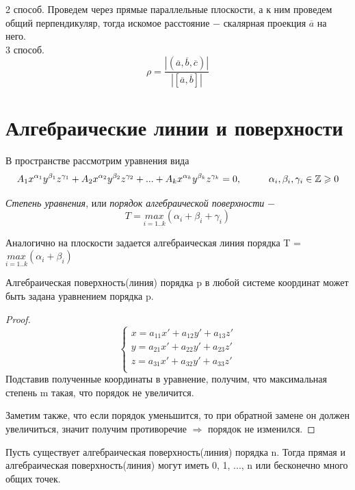 2 способ. Проведем через прямые параллельные плоскости, а к ним проведем общий перпендикуляр, тогда искомое расстояние $-$ скалярная проекция $\overline{a}$ на него.\\

3 способ. \[
\rho = \dfrac{|(\overline{a}, \overline{b}, \overline{c})|}{|[\overline{a}, \overline{b}]|}
\]
\section{Алгебраические линии и поверхности}

В пространстве рассмотрим уравнения вида
\[
A_1 x^{\alpha_1}y^{\beta_1}z^{\gamma_1} + A_2 x^{\alpha_2}y^{\beta_2}z^{\gamma_2} + ... + A_k x^{\alpha_k}y^{\beta_k}z^{\gamma_k} = 0,\hspace*{1cm} \alpha_i, \beta_i, \gamma_i \in \mathbb{Z} \geqslant 0
\]

\begin{definition}
    \textit{Степень уравнения}, или \textit{порядок алгебраической поверхности} $-$
    \[
    T = \underset{i=1..k}{max}(\alpha_i + \beta_i + \gamma_i)
    \]

    Аналогично на плоскости задается алгебраическая линия порядка T = $\underset{i=1..k}{max}(\alpha_i + \beta_i)$
\end{definition}

\begin{theorem}
    Алгебраическая поверхность(линия) порядка p в любой системе координат может быть задана уравнением порядка p.
\end{theorem}
\begin{proof}
    \[
    \begin{cases}
        x = a_{11}x' + a_{12}y' + a_{13}z'\\
        y = a_{21}x' + a_{22}y' + a_{23}z'\\
        z = a_{31}x' + a_{32}y' + a_{33}z'\\
    \end{cases}
    \]
    Подставив полученные координаты в уравнение, получим, что максимальная степень m такая, что порядок не увеличится.

    Заметим также, что если порядок уменьшится, то при обратной замене он должен увеличиться, значит получим противоречие $\Longrightarrow$ порядок не изменился.
\end{proof}

\begin{lemma}
    Пусть существует алгебраическая поверхность(линия) порядка n. Тогда прямая и алгебраическая поверхность(линия) могут иметь 0, 1, ..., n или бесконечно много общих точек.
\end{lemma}














